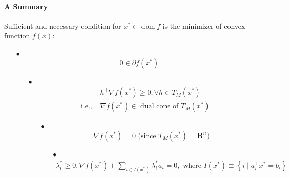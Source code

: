 \documentclass{article}
\newcommand{\dom}{\operatorname{dom}}
\begin{document}
\paragraph{A Summary}
Sufficient and necessary condition for $x^{*} \in \dom  f$ is the minimizer of convex function $f(x)$: 
\begin{enumerate}
    \item[$\bullet$]  $$0 \in \partial f\left(x^{*}\right)$$
    \begin{enumerate} 
        \item[$\bullet$]   \begin{align*}
        &h^{\top} \nabla f\left(x^{*}\right) \geq 0, \forall h \in T_{M}\left(x^{*}\right)\\
         \text{i.e., }   &\nabla f\left(x^{*}\right)\in \text{ dual cone of }T_{M}\left(x^{*}\right)
        \end{align*}
        \begin{enumerate} 
        \item[$\bullet$]   $$\nabla f\left(x^{*}\right)=0 \text{ (since $T_{M}\left(x^{*}\right)=\mathbf{R}^n$)}$$
        \begin{enumerate} 
        \item[$\bullet$]   
        \begin{align}
            \lambda_{i}^{*}\ge 0, \nabla f\left(x^{*}\right)+\sum_{i \in I\left(x^{*}\right)} \lambda_{i}^{*} a_{i}=0,\text{ where } I\left(x^{*}\right) \equiv\left\{i \mid a_{i}^{\top} x^{*}=b_{i}\right\}\label{eq:polvca}
        \end{align}
     \end{enumerate}
     \end{enumerate}
     \end{enumerate}
     
\end{enumerate}
\end{document}
